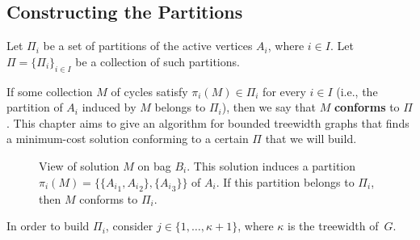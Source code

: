 \subsection{Constructing the Partitions}

Let \(\Pi_i\) be a set of partitions of the active vertices \(A_i\), where $i \in I$.
Let \(\Pi = \{\Pi_i\}_{i \in I}\) be a collection of such partitions.

If some collection \(M\) of cycles satisfy \(\pi_i(M) \in \Pi_i\) for every \(i \in I\) (i.e., the partition of \(A_i\) induced by \(M\) belongs to \(\Pi_i\)), then we say that \(M\) \textbf{conforms} to \(\Pi\). This chapter aims to give an algorithm for bounded treewidth graphs that finds a minimum-cost solution conforming to a certain \(\Pi\) that we will build.

\begin{figure}[H]
    \centering
{}
    \caption{View of solution \(M\) on bag \(B_i\). This solution induces a partition \(\pi_i(M) = \{\{{A_i}_1, {A_i}_2\}, \{{A_i}_3\}\}\) of \(A_i\). If this partition belongs to \(\Pi_i\), then \(M\) conforms to \(\Pi_i\).}
    \label{fig:example_Ai_partition}
\end{figure}

In order to build \(\Pi_i\), consider \(j \in \{1, \dots, \kappa + 1\}\), where \(\kappa\) is the treewidth of~\(G\). 

